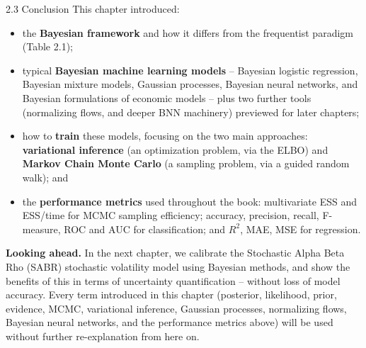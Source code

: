 \documentclass[aspectratio=169,10pt]{beamer}
\begin{document}
\begin{frame}[allowframebreaks]{2.3 Conclusion}
  This chapter introduced:
  \begin{itemize}
    \item the \textbf{Bayesian framework} and how it differs from the
      frequentist paradigm (Table 2.1);
    \item typical \textbf{Bayesian machine learning models} -- Bayesian
      logistic regression, Bayesian mixture models, Gaussian processes,
      Bayesian neural networks, and Bayesian formulations of economic
      models -- plus two further tools (normalizing flows, and deeper BNN
      machinery) previewed for later chapters;
    \item how to \textbf{train} these models, focusing on the two main
      approaches: \textbf{variational inference} (an optimization
      problem, via the ELBO) and \textbf{Markov Chain Monte Carlo}
      (a sampling problem, via a guided random walk); and
    \item the \textbf{performance metrics} used throughout the book:
      multivariate ESS and ESS/time for MCMC sampling efficiency; accuracy,
      precision, recall, F-measure, ROC and AUC for classification; and
      $R^2$, MAE, MSE for regression.
  \end{itemize}

  \framebreak

  \textbf{Looking ahead.} In the next chapter, we calibrate the Stochastic
  Alpha Beta Rho (SABR) stochastic volatility model using Bayesian methods,
  and show the benefits of this in terms of uncertainty quantification --
  without loss of model accuracy. Every term introduced in this chapter
  (posterior, likelihood, prior, evidence, MCMC, variational inference,
  Gaussian processes, normalizing flows, Bayesian neural networks, and the
  performance metrics above) will be used without further re-explanation
  from here on.
\end{frame}
\end{document}
